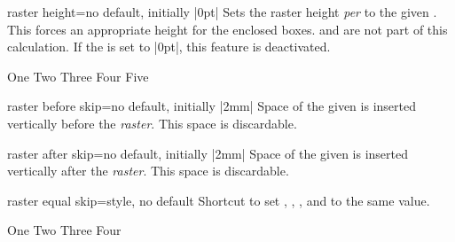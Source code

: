 \clearpage
\begin{docTcbKey}[][doc new=2014-11-10]{raster height}{=}{no default, initially |0pt|}
  Sets the raster height \emph{per}  to the given .
  This forces an appropriate height for the enclosed boxes.
   and 
  are not part of this calculation.
  If the  is set to |0pt|, this feature is deactivated.
\begin{dispExample}
\begin{tcbitemize}[raster height=4cm, raster rows=2,
  size=small,colframe=red!50!black,colback=red!10!white]
  \tcbitem One
  \tcbitem Two
  \tcbitem[enhanced,
    finish={\draw[blue,very thick,<->] (frame.south)
      -- node[right,pos=.75]{4cm} +(0,4); }]
    Three
  \tcbitem Four
  \tcbitem Five
\end{tcbitemize}
\end{dispExample}
\end{docTcbKey}


\begin{docTcbKey}[][doc new and updated={2014-11-10}{2014-12-16}]{raster before skip}{=}{no default, initially |2mm|}
  Space of the given  is inserted vertically before the \emph{raster}.
  This space is discardable.
\end{docTcbKey}

\begin{docTcbKey}[][doc new and updated={2014-11-10}{2014-12-16}]{raster after skip}{=}{no default, initially |2mm|}
  Space of the given  is inserted vertically after the \emph{raster}.
  This space is discardable.
\end{docTcbKey}


\begin{docTcbKey}[][doc new=2015-01-08]{raster equal skip}{=}{style, no default}
  Shortcut to set
  ,
  ,
  , and
  to the same  value.
\begin{dispExample}
\begin{tcbitemize}[raster equal skip=4mm,
  size=small,colframe=red!50!black,colback=red!10!white]
  \tcbitem One
  \tcbitem Two
  \tcbitem Three
  \tcbitem Four
\end{tcbitemize}
\end{dispExample}
\end{docTcbKey}


